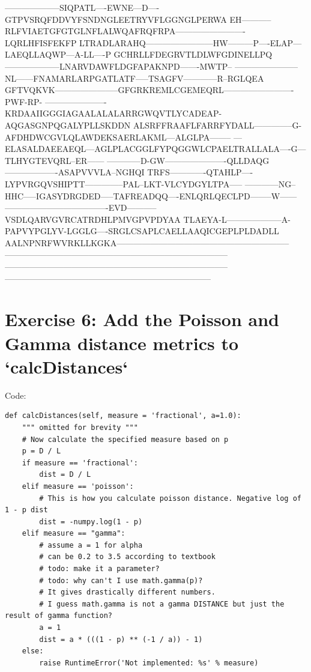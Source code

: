 \documentclass{article} %
\begin{document}
--------------------SIQPATL----EWNE---D----GTPVSRQFDDVYFSNDNGLEETRYVFLGGNGLPERWA
EH-----------RLFVIAETGFGTGLNFLALWQAFRQFRPA-------------------------LQRLHFISFEKFP
LTRADLARAHQ------------------------HW---------P----ELAP---LAEQLLAQWP---A-LL----P
GCHRLLFDEGRVTLDLWFGDINELLPQ--------------------LNARVDAWFLDGFAPAKNPD-------MWTP--
-----------------------NL------FNAMARLARPGATLATF-----TSAGFV------------R--RGLQEA
GFTVQKVK-----------------------GFGRKREMLCGEMEQRL-------------------------PWF-RP-
----------------------KRDAAIIGGGIAGAALALALARRGWQVTLYCADEAP-AQGASGNPQGALYPLLSKDDN
ALSRFFRAAFLFARRFYDALL--------------G-AFDHDWCGVLQLAWDEKSAERLAKML---ALGLPA--------
---ELASALDAEEAEQL---AGLPLACGGLFYPQGGWLCPAELTRALLALA----G---TLHYGTEVQRL--ER------
------------D-GW----------------------QLLDAQG-------------------ASAPVVVLA--NGHQI
TRFS-------------QTAHLP----LYPVRGQVSHIPTT--------------PAL--LKT-VLCYDGYLTPA-----
------------NG--HHC-----IGASYDRGDED-----TAFREADQQ----ENLQRLQECLPD--------W------
-------------------------------------EVD-----------VSDLQARVGVRCATRDHLPMVGPVPDYAA
TLAEYA-L--------------------A-PAPVYPGLYV-LGGLG----SRGLCSAPLCAELLAAQICGEPLPLDADLL
AALNPNRFWVRKLLKGKA--------------------------------------------------------------
--------------------------------------------------------------------------------
--------------------------------------------------------------------------------
--------------------------------------------------------------------------


\section{Exercise 6: Add the Poisson and Gamma distance metrics to `calcDistances`}

Code: 

\begin{verbatim}
def calcDistances(self, measure = 'fractional', a=1.0):
    """ omitted for brevity """
    # Now calculate the specified measure based on p
    p = D / L
    if measure == 'fractional':
        dist = D / L
    elif measure == 'poisson':
        # This is how you calculate poisson distance. Negative log of 1 - p dist
        dist = -numpy.log(1 - p)
    elif measure == "gamma":
        # assume a = 1 for alpha
        # can be 0.2 to 3.5 according to textbook
        # todo: make it a parameter?
        # todo: why can't I use math.gamma(p)? 
        # It gives drastically different numbers.
        # I guess math.gamma is not a gamma DISTANCE but just the result of gamma function?
        a = 1
        dist = a * (((1 - p) ** (-1 / a)) - 1)
    else:
        raise RuntimeError('Not implemented: %s' % measure)
\end{verbatim}
\end{document}
